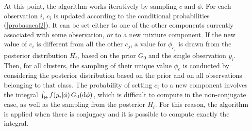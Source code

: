At this point, the algorithm works iteratively by sampling $c$ and $\phi$.
For each observation $i$, $c_i$ is updated according to the conditional probabilities (\ref{probasneal2}).
It can be set either to one of the other components currently associated with some observation, or to a new mixture component.
If the new value of $c_i$ is different from all the other $c_j$, a value for $\phi_{c_i}$ is drawn from the posterior distribution $H_i$, based on the prior $G_0$ and the single observation $y_i$.
Then, for all clusters, the sampling of their unique value $\phi_c$ is conducted by considering the posterior distribution based on the prior and on all observations belonging to that class.
The probability of setting $c_i$ to a new component involves the integral $\int_{\Theta} f(y_{i}|\phi) \, G_0(\mathrm d\phi)$, which is difficult to compute in the non-conjugate case, as well as the sampling from the posterior $H_i$.
For this reason, the algorithm is applied when there is conjugacy and it is possible to compute exactly the integral.

